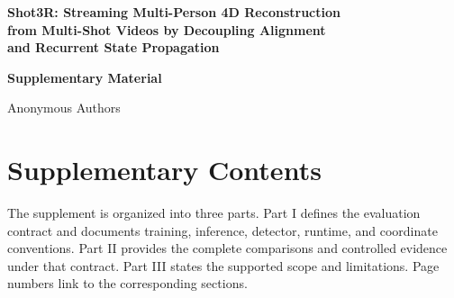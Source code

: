 \begin{center}
  {\Large\bfseries Shot3R: Streaming Multi-Person 4D Reconstruction\\[-1pt]
  from Multi-Shot Videos by Decoupling Alignment\\[-1pt]
  and Recurrent State Propagation}\par
  \vspace{6pt}
  {\large\bfseries Supplementary Material}\par
  \vspace{3pt}
  {\normalsize Anonymous Authors}
\end{center}

\vspace{8pt}
\section*{Supplementary Contents}

The supplement is organized into three parts. Part I defines the evaluation
contract and documents training, inference, detector, runtime, and coordinate
conventions. Part II provides the complete comparisons and controlled evidence
under that contract. Part III states the supported scope and limitations.
Page numbers link to the corresponding sections.

\begingroup
\small
\setlength{\parindent}{0pt}
\setlength{\parskip}{1.5pt}
\newcommand{\apptocpart}[2]{%
  \vspace{2pt}\textbf{#1}%
  \nobreak\leaders\hbox{\kern0.25em.\kern0.25em}\hfill
  \nobreak\makebox[2em][r]{\textbf{\pageref*{#2}}}\par}
\newcommand{\apptocsection}[3]{%
  \hspace*{1.2em}\makebox[2.4em][l]{\textbf{#1}}\textbf{#2}%
  \nobreak\leaders\hbox{\kern0.25em.\kern0.25em}\hfill
  \nobreak\makebox[2em][r]{\textbf{\pageref*{#3}}}\par}
\newcommand{\apptocsubsection}[3]{%
  \hspace*{3.6em}\makebox[3.4em][l]{#1}#2%
  \nobreak\leaders\hbox{\kern0.25em.\kern0.25em}\hfill
  \nobreak\makebox[2em][r]{\pageref*{#3}}\par}
\newcommand{\apptocsubsubsection}[3]{%
  \hspace*{7.0em}\makebox[4.2em][l]{#1}#2%
  \nobreak\leaders\hbox{\kern0.25em.\kern0.25em}\hfill
  \nobreak\makebox[2em][r]{\pageref*{#3}}\par}

